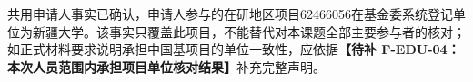 \justifying
\NSFCBodyText

共用申请人事实已确认，申请人参与的在研地区项目62466056在基金委系统登记单位为新疆大学。该事实只覆盖此项目，不能替代对本课题全部主要参与者的核对；如正式材料要求说明承担中国基项目的单位一致性，应依据\textbf{【待补 F-EDU-04：本次人员范围内承担项目单位核对结果】}补充完整声明。
